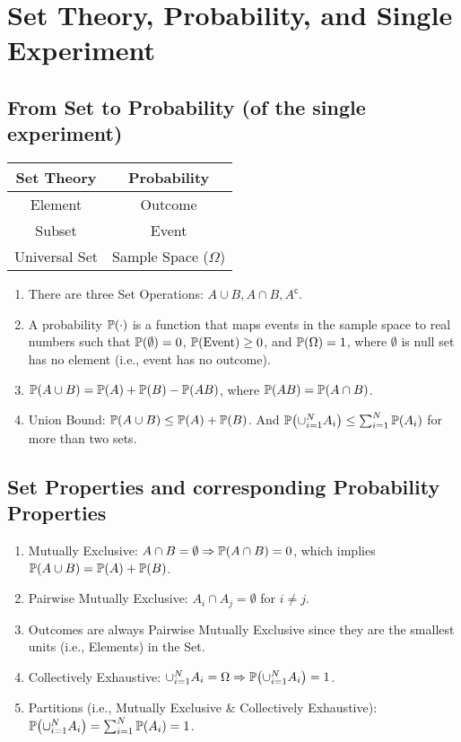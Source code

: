 \chapter{Set Theory, Probability, and Single Experiment}
\section{From Set to Probability (of the single experiment)}
\begin{center}
\begin{tabular}{|c|c|}
    \hline
    \textbf{Set Theory} & \textbf{Probability} \\
    \hline
    \hline
    Element & Outcome \\
    \hline
    Subset  & Event   \\
    \hline
    Universal Set & Sample Space ($\Omega$) \\
    \hline
\end{tabular}
\end{center}
\begin{enumerate}
    \item There are three Set Operations: $A \cup B, A \cap B, A^{\mathsf{c}}$.
    \item A probability $\P{\cdot}$ is a function that maps events in the sample space to real numbers such that $\P{\emptyset}=0$, $\P{\text{Event}}\geq 0$, and $\P{\Omega}=1$, where $\emptyset$ is null set has no element (i.e., event has no outcome).
    \item $\P{A \cup B} = \P{A}+\P{B}-\P{AB}$, where $\P{AB}=\P{A\cap B}$.
    \item Union Bound: $\P{A\cup B}\leq \P{A}+\P{B}$. And $\P{\cup_{i=1}^N A_i}\leq \sum_{i=1}^{N}\P{A_i}$ for more than two sets.
\end{enumerate}
\section{Set Properties and corresponding Probability Properties}
\begin{enumerate}
    \item Mutually Exclusive: $A \cap B = \emptyset \Rightarrow \P{A \cap B}=0$, which implies $\P{A \cup B} = \P{A}+\P{B}$.
    \item Pairwise Mutually Exclusive: $A_i \cap A_j = \emptyset$ for $i\neq j$.
    \item Outcomes are always Pairwise Mutually Exclusive since they are the smallest units (i.e., Elements) in the Set.
    \item Collectively Exhaustive: $\cup_{i=1}^{N}A_i = \Omega \Rightarrow \P{\cup_{i=1}^{N}A_i} = 1$.
    \item Partitions (i.e., Mutually Exclusive \& Collectively Exhaustive): $\P{\cup_{i=1}^N A_i}=\sum_{i=1}^{N}\P{A_i}=1$.
\end{enumerate}
